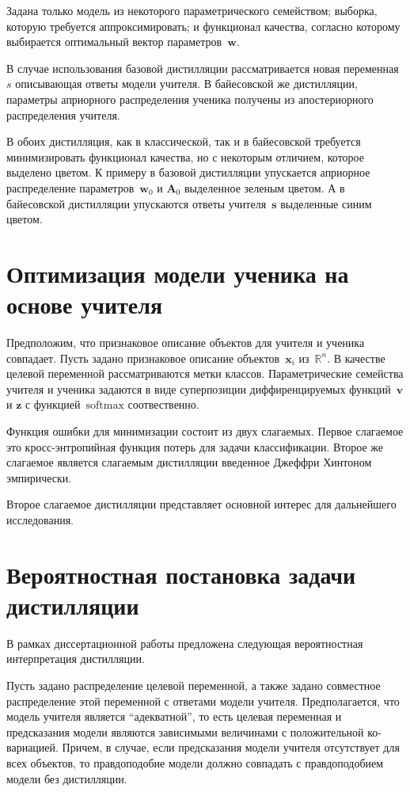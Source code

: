 \documentclass[10pt, twoside]{article}
\begin{document}
Задана только модель из некоторого параметрического семейством; выборка, которую требуется аппроксимировать; и функционал качества, согласно которому выбирается оптимальный вектор параметров~$\mathbf{w}$.

В случае использования базовой дистилляции рассматривается новая переменная~$s$ описывающая ответы модели учителя. В байесовской же дистилляции, параметры априорного распределения ученика получены из апостериорного распределения учителя.

В обоих дистилляция, как в классической, так и в байесовской требуется минимизировать функционал качества, но с некоторым отличием, которое выделено цветом. К примеру в базовой дистилляции упускается априорное распределение параметров~$\mathbf{w}_0$ и $\mathbf{A}_0$ выделенное зеленым цветом. А в байесовской дистилляции упускаются ответы учителя~$\mathbf{s}$ выделенные синим цветом.

\section{Оптимизация модели ученика на основе учителя}
Предположим, что признаковое описание объектов для учителя и ученика совпадает. Пусть задано признаковое описание объектов~$\mathbf{x}_i$ из~$\mathbb{R}^{n}.$ В качестве целевой переменной рассматриваются метки классов. Параметрические семейства учителя и ученика задаются в виде суперпозиции диффиренцируемых функций~$\mathbf{v}$ и $\mathbf{z}$ с функцией~$\text{softmax}$ соотвественно.

Функция ошибки для минимизации состоит из двух слагаемых. Первое слагаемое это кросс-энтропийная функция потерь для задачи классификации. Второе же слагаемое является слагаемым дистилляции введенное Джеффри Хинтоном эмпирически.

Второе слагаемое дистилляции представляет основной интерес для дальнейшего исследования.

\section{Вероятностная постановка задачи дистилляции}
В рамках диссертационной работы предложена следующая вероятностная интерпретация дистилляции.

Пусть задано распределение целевой переменной, а также задано совместное распределение этой переменной с ответами модели учителя. Предполагается, что модель учителя является ``адекватной'', то есть целевая переменная и предсказания модели являются зависимыми величинами с положительной ко-вариацией. Причем, в случае, если предсказания модели учителя отсутствует для всех объектов, то правдоподобие модели должно совпадать с правдоподобием модели без дистилляции.
\end{document}
